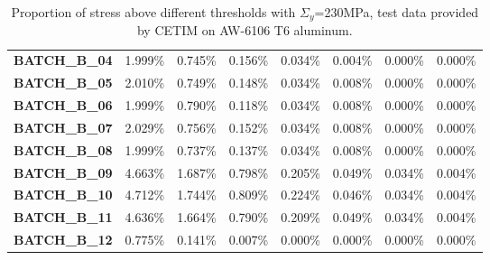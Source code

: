 \begin{table}[!h]
\begin{tabular}{llllllll}
\textbf{BATCH\_B\_04}           & 1.999\%        & 0.745\%        & 0.156\%        & 0.034\%         & 0.004\%         & 0.000\%         & 0.000\%         \\
\textbf{BATCH\_B\_05}           & 2.010\%        & 0.749\%        & 0.148\%        & 0.034\%         & 0.008\%         & 0.000\%         & 0.000\%         \\
\textbf{BATCH\_B\_06}           & 1.999\%        & 0.790\%        & 0.118\%        & 0.034\%         & 0.008\%         & 0.000\%         & 0.000\%         \\
\textbf{BATCH\_B\_07}           & 2.029\%        & 0.756\%        & 0.152\%        & 0.034\%         & 0.008\%         & 0.000\%         & 0.000\%         \\
\textbf{BATCH\_B\_08}           & 1.999\%        & 0.737\%        & 0.137\%        & 0.034\%         & 0.008\%         & 0.000\%         & 0.000\%         \\
\textbf{BATCH\_B\_09}           & 4.663\%        & 1.687\%        & 0.798\%        & 0.205\%         & 0.049\%         & 0.034\%         & 0.004\%         \\
\textbf{BATCH\_B\_10}           & 4.712\%        & 1.744\%        & 0.809\%        & 0.224\%         & 0.046\%         & 0.034\%         & 0.004\%         \\
\textbf{BATCH\_B\_11}           & 4.636\%        & 1.664\%        & 0.790\%        & 0.209\%         & 0.049\%         & 0.034\%         & 0.004\%         \\
\textbf{BATCH\_B\_12}           & 0.775\%        & 0.141\%        & 0.007\%        & 0.000\%         & 0.000\%         & 0.000\%         & 0.000\%         \\ \hline
\end{tabular}
\caption{Proportion of stress above different thresholds with $\Sigma_y$=230MPa, test data provided by CETIM on AW-6106 T6 aluminum.}
\label{tab.majordamage}
\end{table}

